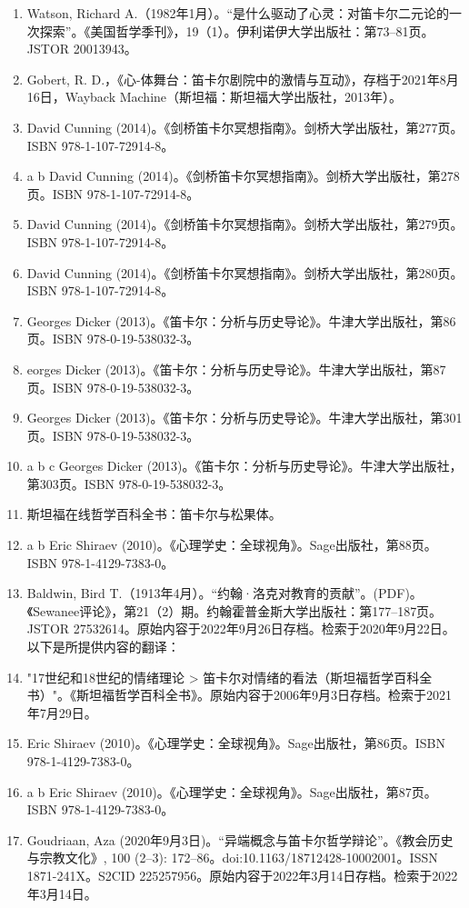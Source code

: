 \begin{enumerate}
\item Watson, Richard A.（1982年1月）。“是什么驱动了心灵：对笛卡尔二元论的一次探索”。《美国哲学季刊》，19（1）。伊利诺伊大学出版社：第73–81页。JSTOR 20013943。
\item Gobert, R. D.，《心-体舞台：笛卡尔剧院中的激情与互动》，存档于2021年8月16日，Wayback Machine（斯坦福：斯坦福大学出版社，2013年）。
\item David Cunning (2014)。《剑桥笛卡尔冥想指南》。剑桥大学出版社，第277页。ISBN 978-1-107-72914-8。
\item a b David Cunning (2014)。《剑桥笛卡尔冥想指南》。剑桥大学出版社，第278页。ISBN 978-1-107-72914-8。
\item David Cunning (2014)。《剑桥笛卡尔冥想指南》。剑桥大学出版社，第279页。ISBN 978-1-107-72914-8。
\item David Cunning (2014)。《剑桥笛卡尔冥想指南》。剑桥大学出版社，第280页。ISBN 978-1-107-72914-8。
\item Georges Dicker (2013)。《笛卡尔：分析与历史导论》。牛津大学出版社，第86页。ISBN 978-0-19-538032-3。
\item eorges Dicker (2013)。《笛卡尔：分析与历史导论》。牛津大学出版社，第87页。ISBN 978-0-19-538032-3。
\item Georges Dicker (2013)。《笛卡尔：分析与历史导论》。牛津大学出版社，第301页。ISBN 978-0-19-538032-3。
\item a b c Georges Dicker (2013)。《笛卡尔：分析与历史导论》。牛津大学出版社，第303页。ISBN 978-0-19-538032-3。
\item 斯坦福在线哲学百科全书：笛卡尔与松果体。
\item a b Eric Shiraev (2010)。《心理学史：全球视角》。Sage出版社，第88页。ISBN 978-1-4129-7383-0。
\item Baldwin, Bird T.（1913年4月）。“约翰·洛克对教育的贡献”。(PDF)。《Sewanee评论》，第21（2）期。约翰霍普金斯大学出版社：第177–187页。JSTOR 27532614。原始内容于2022年9月26日存档。检索于2020年9月22日。
以下是所提供内容的翻译：
\item "17世纪和18世纪的情绪理论 > 笛卡尔对情绪的看法（斯坦福哲学百科全书）"。《斯坦福哲学百科全书》。原始内容于2006年9月3日存档。检索于2021年7月29日。
\item Eric Shiraev (2010)。《心理学史：全球视角》。Sage出版社，第86页。ISBN 978-1-4129-7383-0。
\item a b Eric Shiraev (2010)。《心理学史：全球视角》。Sage出版社，第87页。ISBN 978-1-4129-7383-0。
\item Goudriaan, Aza (2020年9月3日)。“异端概念与笛卡尔哲学辩论”。《教会历史与宗教文化》, 100 (2–3): 172–86。doi:10.1163/18712428-10002001。ISSN 1871-241X。S2CID 225257956。原始内容于2022年3月14日存档。检索于2022年3月14日。

\end{enumerate}
